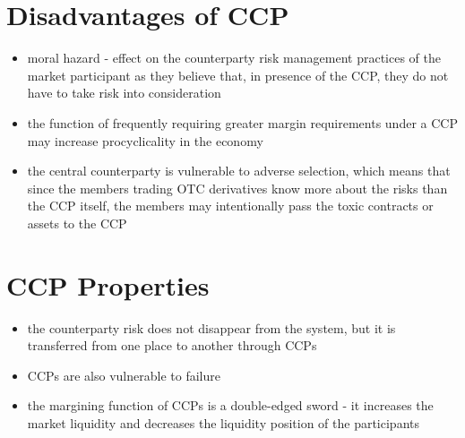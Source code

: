 \section{Disadvantages of CCP}
\begin{itemize}
	\item moral hazard - effect on the counterparty risk management practices of the market participant as they believe that, in presence of the CCP, they do not have to take risk into consideration
	\item the function of frequently requiring greater margin requirements under a CCP may increase procyclicality in the economy
	\item the central counterparty is vulnerable to adverse selection, which means that since the members trading OTC derivatives know more about the risks than the CCP itself, the members may intentionally pass the toxic contracts or assets to the CCP
\end{itemize}

\section{CCP Properties}
\begin{itemize}
	\item the counterparty risk does not disappear from the system, but it is transferred from one place to another through CCPs
	\item CCPs are also vulnerable to failure
	\item the margining function of CCPs is a double-edged sword - it increases the market liquidity and decreases the liquidity position of the participants
\end{itemize}

